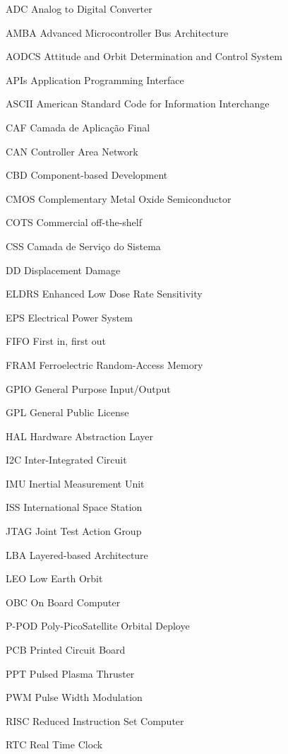 
\begin{siglas} 		
\item[ADC	] Analog to Digital Converter
\item[AMBA	] Advanced Microcontroller Bus Architecture
\item[AODCS	] Attitude and Orbit Determination and Control System
\item[APIs	] Application Programming Interface
\item[ASCII	] American Standard Code for Information Interchange
\item[CAF	] Camada de Aplicação Final
\item[CAN	] Controller Area Network
\item[CBD	] Component-based Development
\item[CMOS	] Complementary Metal Oxide Semiconductor
\item[COTS	] Commercial off-the-shelf
\item[CSS	] Camada de Serviço do Sistema
\item[DD	] Displacement Damage
\item[ELDRS	] Enhanced Low Dose Rate Sensitivity
\item[EPS	] Electrical Power System
\item[FIFO	] First in, first out
\item[FRAM	] Ferroelectric Random-Access Memory
\item[GPIO	] General Purpose Input/Output
\item[GPL	] General Public License
\item[HAL	] Hardware Abstraction Layer
\item[I2C	] Inter-Integrated Circuit
\item[IMU	] Inertial Measurement Unit
\item[ISS	] International Space Station
\item[JTAG	] Joint Test Action Group
\item[LBA	] Layered-based Architecture
\item[LEO	] Low Earth Orbit
\item[OBC	] On Board Computer
\item[P-POD	] Poly-PicoSatellite Orbital Deploye
\item[PCB	] Printed Circuit Board
\item[PPT	] Pulsed Plasma Thruster 
\item[PWM	] Pulse Width Modulation
\item[RISC	] Reduced Instruction Set Computer
\item[RTC	] Real Time Clock

\end{siglas}
